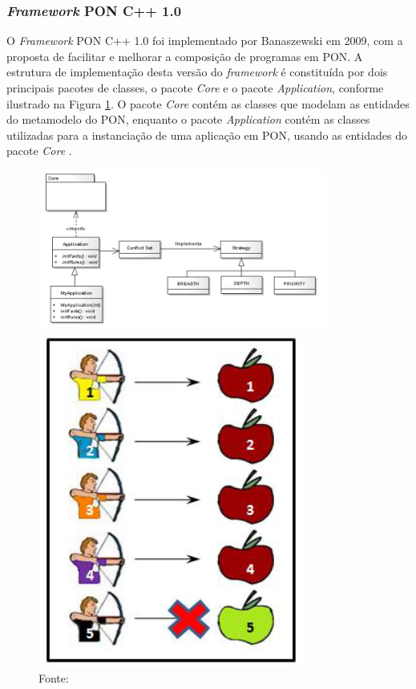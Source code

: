 \vspace{-1cm}
\subsubsection{\textit{Framework} PON C++ 1.0}

O \textit{Framework} PON C++ 1.0 foi implementado por Banaszewski em 2009, com a
proposta de facilitar e melhorar a composição de programas em PON. A estrutura
de implementação desta versão do \textit{framework} é constituída por dois
principais pacotes de classes, o pacote \textit{Core} e o pacote
\textit{Application}, conforme ilustrado na Figura \ref{fig:fw_pkg}. O pacote
\textit{Core} contém as classes que modelam as entidades do metamodelo do PON,
enquanto o pacote \textit{Application} contém as classes utilizadas para a
instanciação de uma aplicação em PON, usando as entidades do pacote
\textit{Core} \cite{msc_Banaszewski_2009}.

\begin{figure}[!htb]
  \centering
  \includegraphics[width=0.85\textwidth]{../figures/fw1_structure.png}
  \caption{Estrutura do \textit{framework} C++ 1.0} \includegraphics[width=.8\textwidth]{../figures/mira_alvo.png}
  \caption*{Fonte:
    }
  \label{fig:fw_pkg}
\end{figure}

